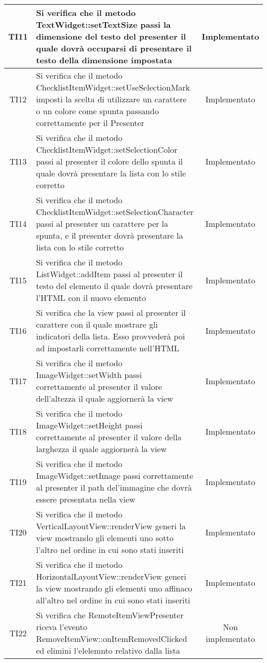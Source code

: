 \begin{center}
\begin{longtable}{|c|>{\centering}m{10cm}|c|}
		TI11 & Si verifica che il metodo TextWidget::setTextSize passi la dimensione del testo del presenter il quale dovrà occuparsi di presentare il testo della dimensione impostata & Implementato \\ \hline
		TI12 & Si verifica che il metodo ChecklistItemWidget::setUseSelectionMark imposti la scelta di utilizzare un carattere o un colore come spunta passando correttamente per il Presenter & Implementato \\ \hline
		TI13 & Si verifica che il metodo ChecklistItemWidget::setSelectionColor passi al presenter il colore dello spunta il quale dovrà presentare la lista con lo stile corretto & Implementato \\ \hline
		TI14 & Si verifica che il metodo ChecklistItemWidget::setSelectionCharacter passi al presenter un carattere per la spunta, e il presenter dovrà presentare la lista con lo stile corretto & Implementato \\ \hline
		TI15 & Si verifica che il metodo ListWidget::addItem passi al presenter il testo del elemento il quale dovrà presentare l'HTML con il nuovo elemento & Implementato \\ \hline
		TI16 & Si verifica che la view passi al presenter il carattere con il quale mostrare gli indicatori della lista. Esso provvederà poi ad impostarli correttamente nell'HTML & Implementato \\ \hline
		TI17 & Si verifica che il metodo ImageWidget::setWidth passi correttamente al presenter il valore dell'altezza il quale aggiornerà la view & Implementato \\ \hline
		TI18 & Si verifica che il metodo ImageWidget::setHeight passi correttamente al presenter il valore della larghezza il quale aggiornerà la view & Implementato \\ \hline
		TI19 & Si verifica che il metodo ImageWidget::setImage passi correttamente al presenter il path del'immagine che dovrà essere presentata nella view & Implementato \\ \hline
		TI20 & Si verifica che il metodo VerticalLayoutView::renderView generi la view mostrando gli elementi uno sotto l'altro nel ordine in cui sono stati inseriti & Implementato \\ \hline
		TI21 & Si verifica che il metodo HorizontalLayoutView::renderView generi la view mostrando gli elementi uno affinaco all'altro nel ordine in cui sono stati inseriti & Implementato \\ \hline
		TI22 & Si verifica che RemoteItemViewPresenter riceva l'evento RemoveItemView::onItemRemovedClicked ed elimini l'elelemnto relativo dalla lista & Non implementato \\ \hline

\end{longtable}
\end{center}
